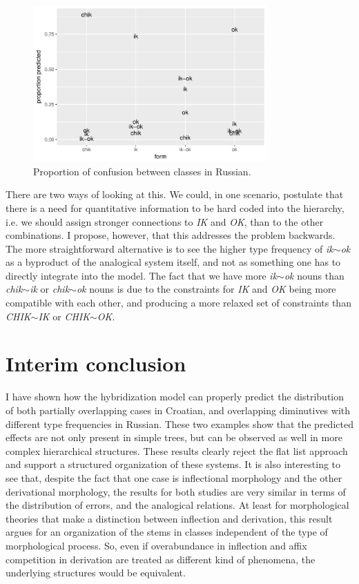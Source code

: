 \begin{figure}[!htpb]
  \centering
  \includegraphics[width=0.8\textwidth]{./figures/russian/rus.pdf}
  \caption{Proportion of confusion between classes in Russian.}\label{fig:russian-results}
\end{figure}


There are two ways of looking at this. We could, in one scenario, postulate that there is a need for quantitative information to be hard coded into the hierarchy, i.e. we should assign stronger connections to \textit{IK} and \textit{OK}, than to the other combinations. I propose, however, that this addresses the problem backwards. The more straightforward alternative is to see the higher type frequency of \textit{ik$\sim$ok} as a byproduct of the analogical system itself, and not as something one has to directly integrate into the model. The fact that we have more \textit{ik$\sim$ok} nouns than \textit{chik$\sim$ik} or \textit{chik$\sim$ok} nouns is due to the constraints for \textit{IK} and \textit{OK} being more compatible with each other, and producing a more relaxed set of constraints than \textit{CHIK$\sim$IK} or \textit{CHIK$\sim$OK}.


\section{Interim conclusion}

I have shown how the hybridization model can properly predict the distribution of both partially overlapping cases in Croatian, and overlapping diminutives with different type frequencies in Russian. These two examples show that the predicted effects are not only present in simple trees, but can be observed as well in more complex hierarchical structures. These results clearly reject the flat list approach and support a structured organization of these systems. It is also interesting to see that, despite the fact that one case is inflectional morphology and the other derivational morphology, the results for both studies are very similar in terms of the distribution of errors, and the analogical relations. At least for morphological theories that make a distinction between inflection and derivation, this result argues for an organization of the stems in classes independent of the type of morphological process. So, even if overabundance in inflection and affix competition in derivation are treated as different kind of phenomena, the underlying structures would be equivalent.

